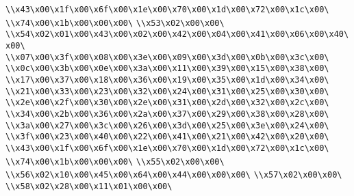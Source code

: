 \verb|\\x43\x00\x1f\x00\x6f\x00\x1e\x00\x70\x00\x1d\x00\x72\x00\x1c\x00\|\newline
\verb|\\x74\x00\x1b\x00\x00\x00\|\newline
\verb|\\x53\x02\x00\x00\|\newline
\verb|\\x54\x02\x01\x00\x43\x00\x02\x00\x42\x00\x04\x00\x41\x00\x06\x00\x40\x00\|\newline
\verb|\\x07\x00\x3f\x00\x08\x00\x3e\x00\x09\x00\x3d\x00\x0b\x00\x3c\x00\|\newline
\verb|\\x0c\x00\x3b\x00\x0e\x00\x3a\x00\x11\x00\x39\x00\x15\x00\x38\x00\|\newline
\verb|\\x17\x00\x37\x00\x18\x00\x36\x00\x19\x00\x35\x00\x1d\x00\x34\x00\|\newline
\verb|\\x21\x00\x33\x00\x23\x00\x32\x00\x24\x00\x31\x00\x25\x00\x30\x00\|\newline
\verb|\\x2e\x00\x2f\x00\x30\x00\x2e\x00\x31\x00\x2d\x00\x32\x00\x2c\x00\|\newline
\verb|\\x34\x00\x2b\x00\x36\x00\x2a\x00\x37\x00\x29\x00\x38\x00\x28\x00\|\newline
\verb|\\x3a\x00\x27\x00\x3c\x00\x26\x00\x3d\x00\x25\x00\x3e\x00\x24\x00\|\newline
\verb|\\x3f\x00\x23\x00\x40\x00\x22\x00\x41\x00\x21\x00\x42\x00\x20\x00\|\newline
\verb|\\x43\x00\x1f\x00\x6f\x00\x1e\x00\x70\x00\x1d\x00\x72\x00\x1c\x00\|\newline
\verb|\\x74\x00\x1b\x00\x00\x00\|\newline
\verb|\\x55\x02\x00\x00\|\newline
\verb|\\x56\x02\x10\x00\x45\x00\x64\x00\x44\x00\x00\x00\|\newline
\verb|\\x57\x02\x00\x00\|\newline
\verb|\\x58\x02\x28\x00\x11\x01\x00\x00\|\newline
